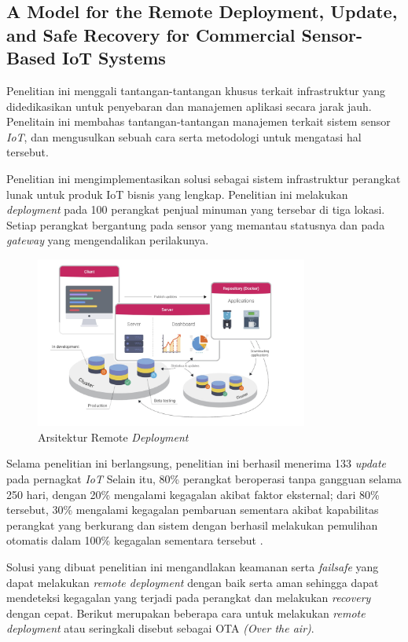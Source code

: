 \subsection{A Model for the Remote Deployment, Update, and Safe Recovery for Commercial Sensor-Based IoT Systems}
Penelitian ini menggali tantangan-tantangan khusus terkait infrastruktur yang didedikasikan untuk penyebaran dan manajemen aplikasi secara jarak jauh. Penelitain ini membahas tantangan-tantangan manajemen terkait sistem sensor \textit{IoT}, dan mengusulkan sebuah cara serta metodologi untuk mengatasi hal tersebut.

Penelitian ini mengimplementasikan solusi sebagai sistem infrastruktur perangkat lunak untuk produk IoT bisnis yang lengkap. Penelitian ini melakukan \textit{deployment} pada 100 perangkat penjual minuman yang tersebar di tiga lokasi. Setiap perangkat bergantung pada sensor yang memantau statusnya dan pada \textit{gateway} yang mengendalikan perilakunya.

\begin{figure}[ht]
  \centering
  \includegraphics[width=0.8\textwidth]{resources/chapter-2/arsitektur-remote-deployment.jpg}
  \caption{Arsitektur Remote \textit{Deployment} \parencite{RemoteDeployment}}
  \label{fig:architecture-remote-deployments}
\end{figure}

Selama penelitian ini berlangsung, penelitian ini berhasil menerima 133 \textit{update} pada pernagkat \textit{IoT} Selain itu, 80\% perangkat beroperasi tanpa gangguan selama 250 hari, dengan 20\% mengalami kegagalan akibat faktor eksternal; dari 80\% tersebut, 30\% mengalami kegagalan pembaruan sementara akibat kapabilitas perangkat yang berkurang dan sistem dengan berhasil melakukan pemulihan otomatis dalam 100\% kegagalan sementara tersebut \parencite{RemoteDeployment}.

Solusi yang dibuat penelitian ini mengandlakan keamanan serta \textit{failsafe} yang dapat melakukan \textit{remote deployment} dengan baik serta aman sehingga dapat mendeteksi kegagalan yang terjadi pada perangkat dan melakukan \textit{recovery} dengan cepat. Berikut merupakan beberapa cara untuk melakukan \textit{remote deployment} atau seringkali disebut sebagai OTA \textit{(Over the air)}.


